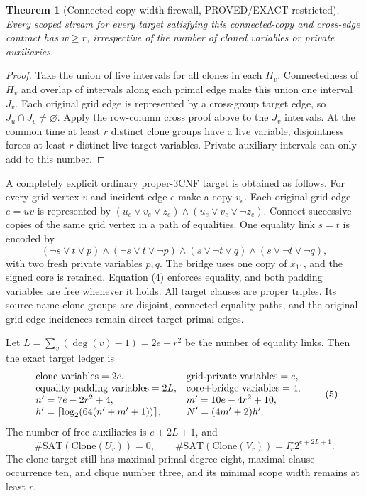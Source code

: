\documentclass[11pt]{article}
\newtheorem{theorem}{Theorem}
\begin{document}
\begin{theorem}[Connected-copy width firewall, PROVED/EXACT restricted]
Every scoped stream for every target satisfying this connected-copy and cross-edge contract has $w\ge r$, irrespective of the number of cloned variables or private auxiliaries.
\end{theorem}
\begin{proof}
Take the union of live intervals for all clones in each $H_v$. Connectedness of $H_v$ and overlap of intervals along each primal edge make this union one interval $J_v$. Each original grid edge is represented by a cross-group target edge, so $J_u\cap J_v\neq\varnothing$. Apply the row-column cross proof above to the $J_v$ intervals. At the common time at least $r$ distinct clone groups have a live variable; disjointness forces at least $r$ distinct live target variables. Private auxiliary intervals can only add to this number.
\end{proof}

A completely explicit ordinary proper-3CNF target is obtained as follows. For every grid vertex $v$ and incident edge $e$ make a copy $v_e$. Each original grid edge $e=uv$ is represented by $(u_e\vee v_e\vee z_e)\wedge(u_e\vee v_e\vee\neg z_e)$. Connect successive copies of the same grid vertex in a path of equalities. One equality link $s=t$ is encoded by
\[
(\neg s\vee t\vee p)\wedge(\neg s\vee t\vee\neg p)\wedge
(s\vee\neg t\vee q)\wedge(s\vee\neg t\vee\neg q),\tag{4}
\]
with two fresh private variables $p,q$. The bridge uses one copy of $x_{11}$, and the signed core is retained. Equation (4) enforces equality, and both padding variables are free whenever it holds. All target clauses are proper triples. Its source-name clone groups are disjoint, connected equality paths, and the original grid-edge incidences remain direct target primal edges.

Let $L=\sum_v(\deg(v)-1)=2e-r^2$ be the number of equality links. Then the exact target ledger is
\[
\begin{array}{ll}
\hbox{clone variables}=2e,&\hbox{grid-private variables}=e,\\
\hbox{equality-padding variables}=2L,&\hbox{core+bridge variables}=4,\\
n'=7e-2r^2+4,&m'=10e-4r^2+10,\\
h'=\lceil\log_2(64(n'+m'+1))\rceil,&N'=(4m'+2)h'.
\end{array}\tag{5}
\]
The number of free auxiliaries is $e+2L+1$, and
\[
\#\mathrm{SAT}(\mathrm{Clone}(U_r))=0,\qquad
\#\mathrm{SAT}(\mathrm{Clone}(V_r))=I_r^\star2^{e+2L+1}.\tag{6}
\]
The clone target still has maximal primal degree eight, maximal clause occurrence ten, and clique number three, and its minimal scope width remains at least $r$.
\end{document}
